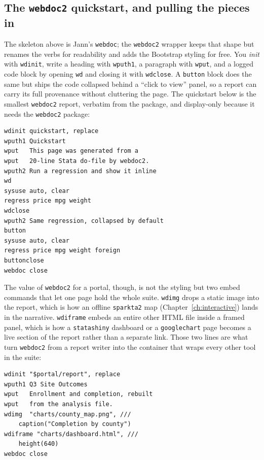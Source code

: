 \documentclass[
    a4paper,
    fontsize=10pt,
    twoside=true,
    numbers=noenddot,
]{kaobook}
\begin{document}
\subsection{The \texttt{webdoc2} quickstart, and pulling the pieces in}
The skeleton above is Jann's \texttt{webdoc}; the \texttt{webdoc2} wrapper keeps that shape but renames the verbs for readability and adds the Bootstrap styling for free. You \emph{init} with \texttt{wdinit}, write a heading with \texttt{wputh1}, a paragraph with \texttt{wput}, and a logged code block by opening \texttt{wd} and closing it with \texttt{wdclose}. A \texttt{button} block does the same but ships the code collapsed behind a \enquote{click to view} panel, so a report can carry its full provenance without cluttering the page. The quickstart below is the smallest \texttt{webdoc2} report, verbatim from the package, and display-only because it needs the \texttt{webdoc2} package:
{\footnotesize
\begin{verbatim}
wdinit quickstart, replace
wputh1 Quickstart
wput   This page was generated from a
wput   20-line Stata do-file by webdoc2.
wputh2 Run a regression and show it inline
wd
sysuse auto, clear
regress price mpg weight
wdclose
wputh2 Same regression, collapsed by default
button
sysuse auto, clear
regress price mpg weight foreign
buttonclose
webdoc close
\end{verbatim}
}
The value of \texttt{webdoc2} for a portal, though, is not the styling but two embed commands that let one page hold the whole suite. \texttt{wdimg} drops a static image into the report, which is how an offline \texttt{sparkta2} map (Chapter~\ref{ch:interactive}) lands in the narrative. \texttt{wdiframe} embeds an entire other HTML file inside a framed panel, which is how a \texttt{statashiny} dashboard or a \texttt{googlechart} page becomes a live section of the report rather than a separate link. Those two lines are what turn \texttt{webdoc2} from a report writer into the container that wraps every other tool in the suite:
{\footnotesize
\begin{verbatim}
wdinit "$portal/report", replace
wputh1 Q3 Site Outcomes
wput   Enrollment and completion, rebuilt
wput   from the analysis file.
wdimg  "charts/county_map.png", ///
    caption("Completion by county")
wdiframe "charts/dashboard.html", ///
    height(640)
webdoc close
\end{verbatim}
}
\end{document}
